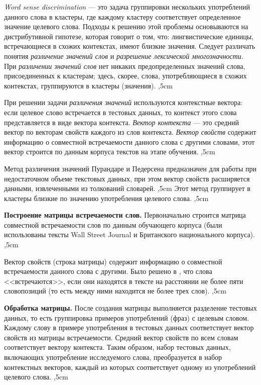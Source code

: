 \documentclass{article}
\begin{document}
\begin{articletext}
\textit{Word sense discrimination} --- это задача группировки нескольких употреблений данного слова в кластеры, где каждому кластеру соответствует определенное значение целевого слова. Подходы к решению этой проблемы основываются на дистрибутивной гипотезе, которая говорит о том, что: лингвистические единицы, встречающиеся в схожих контекстах, имеют близкие значения. Следует различать понятия \textit{различение значений слов} и \textit{разрешение лексической многозначности}. При \textit{различении значений слов} нет никаких предопределенных значений слова, присоединенных к кластерам; здесь, скорее, слова, употребляющиеся в схожих контекстах, группируются в кластеры (значения).
,5cm

При решении задачи \textit{различения значений} используются контекстные вектора: если целевое слово встречается в тестовых данных, то контекст этого слова представляется в виде вектора контекста. \textit{Вектор контекста} --- это средний вектор по векторам свойств каждого из слов контекста. \textit{Вектор свойств} содержит информацию о совместной встречаемости данного слова с другими словами, этот вектор строится по данным корпуса текстов на этапе обучения.
,5cm

Метод различения значений Пурандаре и Педерсена \cite{Purandare 2004} предназначен для работы при недостаточном объеме текстовых данных, при этом вектор свойств расширяется данными, извлеченными из толкований словарей.
,5cm
Этот метод группирует в кластеры близкие по значению употребления целевого слова.
,5cm

\textbf{Построение матрицы встречаемости слов.} Первоначально строится матрица совместной встречаемости слов по данным обучающего корпуса (были использованы тексты Wall Street Journal и Британского национального корпуса).
,5cm

Вектор свойств (строка матрицы) содержит информацию о совместной встречаемости данного слова с другими. Было решено в \cite{Purandare 2004}, что слова <<встречаются>>, если они находятся в тексте на расстоянии не более пяти словопозиций (то есть между ними находится не более трех слов). 
,5cm

\textbf{Обработка матрицы.} После создания матрицы выполняется разделение тестовых данных, то есть группировка примеров употреблений (фраз) с целевым словом. Каждому слову в примере употребления  в тестовых данных соответствует вектор свойств из матрицы встречаемости. Средний вектор свойств по всем словам соответствует вектору контекста. Таким образом, набор тестовых данных, включающих употребление исследуемого слова, преобразуется в набор контекстных векторов, каждый из которых соответствует одному из употреблений целевого слова.
,5cm


\end{articletext}
\end{document}
